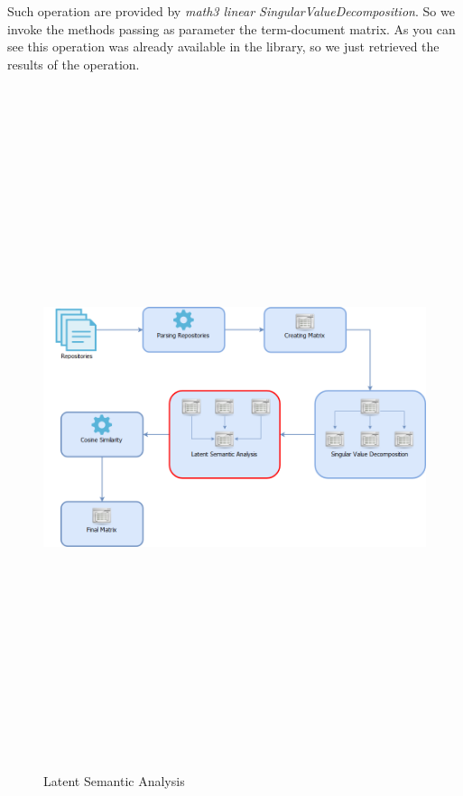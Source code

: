 Such operation are provided by \emph{math3 linear SingularValueDecomposition}.
So we invoke the methods passing as parameter the term-document matrix.
As you can see this operation was already available in the library, so we just retrieved the results of the operation.

\begin{figure}[H]
\includegraphics[width=15cm,height=20cm,keepaspectratio]{images/Architecture4.png}
\caption{Latent Semantic Analysis}
\end{figure}

